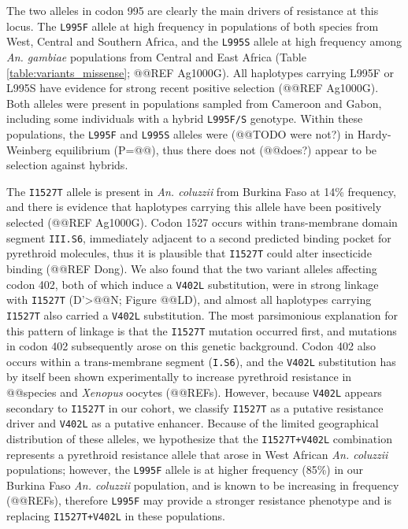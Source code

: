 \documentclass[a4paper,11pt,abstracton]{scrartcl}
\begin{document}
%
The two alleles in codon 995 are clearly the main drivers of resistance at this locus.
%
The \texttt{L995F} allele at high frequency in populations of both species from West, Central and Southern Africa, and the \texttt{L995S} allele at high frequency among \textit{An. gambiae} populations from Central and East Africa (Table \ref{table:variants_missense}; @@REF Ag1000G).
%
All haplotypes carrying L995F or L995S have evidence for strong recent positive selection (@@REF Ag1000G).
%
Both alleles were present in populations sampled from Cameroon and Gabon, including some individuals with a hybrid \texttt{L995F/S} genotype. Within these populations, the \texttt{L995F} and \texttt{L995S} alleles were (@@TODO were not?) in Hardy-Weinberg equilibrium (P=@@), thus there does not (@@does?) appear to be selection against hybrids.


%
The \texttt{I1527T} allele is present in \textit{An. coluzzii} from Burkina Faso at 14\% frequency, and there is evidence that haplotypes carrying this allele have been positively selected (@@REF Ag1000G).
%
Codon 1527 occurs within trans-membrane domain segment \texttt{III.S6}, immediately adjacent to a second predicted binding pocket for pyrethroid molecules, thus it is plausible that \texttt{I1527T} could alter insecticide binding (@@REF Dong).
%
We also found that the two variant alleles affecting codon 402, both of which induce a \texttt{V402L} substitution, were in strong linkage with \texttt{I1527T} (D'>@@N; Figure @@LD), and almost all haplotypes carrying \texttt{I1527T} also carried a \texttt{V402L} substitution.
%
The most parsimonious explanation for this pattern of linkage is that the \texttt{I1527T} mutation occurred first, and mutations in codon 402 subsequently arose on this genetic background.
%
Codon 402 also occurs within a trans-membrane segment (\texttt{I.S6}), and the \texttt{V402L} substitution has by itself been shown experimentally to increase pyrethroid resistance in @@species and \textit{Xenopus} oocytes (@@REFs).
%
However, because \texttt{V402L} appears secondary to \texttt{I1527T} in our cohort, we classify \texttt{I1527T} as a putative resistance driver and \texttt{V402L} as a putative enhancer.
%
Because of the limited geographical distribution of these alleles, we hypothesize that the \texttt{I1527T+V402L} combination represents a pyrethroid resistance allele that arose in West African \textit{An. coluzzii} populations; however, the \texttt{L995F} allele is at higher frequency (85\%) in our Burkina Faso \textit{An. coluzzii} population, and is known to be increasing in frequency (@@REFs), therefore \texttt{L995F} may provide a stronger resistance phenotype and is replacing \texttt{I1527T+V402L} in these populations.
\end{document}
